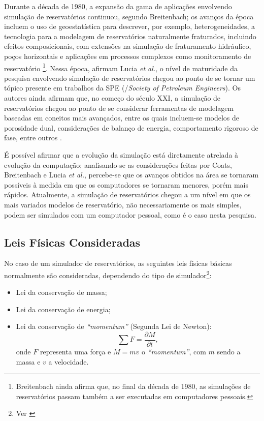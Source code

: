Durante a d\'{e}cada de 1980, a expans\~{a}o da gama de aplica\c{c}\~{o}es envolvendo simula\c{c}\~{a}o de reservat\'{o}rios continuou, segundo Breitenbach; os avan\c{c}os da \'{e}poca incluem o uso de geoestat\'{i}stica para descrever, por exemplo, heterogeneidades, a tecnologia para a modelagem de reservat\'{o}rios naturalmente fraturados, incluindo efeitos composicionais, com extens\~{o}es na simula\c{c}\~{a}o de fraturamento hidr\'{a}ulico, po\c{c}os horizontais e aplica\c{c}\~{o}es em processos complexos como monitoramento de reservat\'{o}rio \cite{breitenbach1991}\footnote{Breitenbach ainda afirma que, no final da d\'{e}cada de 1980, as simula\c{c}\~{o}es de reservat\'{o}rios passam tamb\'{e}m a ser executadas em computadores pessoais.}. Nessa \'{e}poca, afirmam Lucia \textit{et al.}, o n\'{i}vel de maturidade da pesquisa envolvendo simula\c{c}\~{a}o de reservat\'{o}rios chegou ao ponto de se tornar um t\'{o}pico presente em trabalhos da SPE (/\textit{Society of Petroleum Engineers}). Os autores ainda afirmam que, no come\c{c}o do s\'{e}culo XXI, a simula\c{c}\~{a}o de reservat\'{o}rios chegou ao ponto de se considerar ferramentas de modelagem baseadas em coneitos mais avan\c{c}ados, entre os quais incluem-se modelos de porosidade dual, considera\c{c}\~{o}es de balan\c{c}o de energia, comportamento rigoroso de fase, entre outros  \cite{luciaetal}.

\'{E} poss\'{i}vel afirmar que a evolu\c{c}\~{a}o da simula\c{c}\~{a}o est\'{a} diretamente atrelada \`{a} evolu\c{c}\~{a}o da computa\c{c}\~{a}o; analisando-se as considera\c{c}\~{o}es feitas por Coats, Breitenbach e Lucia \textit{et al.}, percebe-se que os avan\c{c}os obtidos na \'{a}rea se tornaram poss\'{i}veis \`{a} medida em que os computadores se tornaram menores, por\'{e}m mais r\'{a}pidos. Atualmente, a simula\c{c}\~{a}o de reservat\'{o}rios chegou a um n\'{i}vel em que os mais variados modelos de reservat\'{o}rio, n\~{a}o necessariamente os mais simples, podem ser simulados com um computador pessoal, como \'{e} o caso nesta pesquisa.

\subsection{Leis F\'{i}sicas Consideradas}

No caso de um simulador de reservat\'{o}rios, as seguintes leis f\'{i}sicas b\'{a}sicas normalmente s\~{a}o consideradas, dependendo do tipo de simulador\footnote{Ver \cite[p. 520]{engres}}:

\begin{itemize}
\item Lei da conserva\c{c}\~{a}o de massa;
\item Lei da conserva\c{c}\~{a}o de energia;
\item Lei da conserva\c{c}\~{a}o de \textit{``momentum''} (Segunda Lei de Newton):
\begin{equation}
\sum F = \frac{\partial M}{\partial t},
\end{equation}
onde $F$ representa uma for\c{c}a e $M = mv$ o \textit{``momentum''}, com $m$ sendo a massa e $v$ a velocidade.
\end{itemize}

